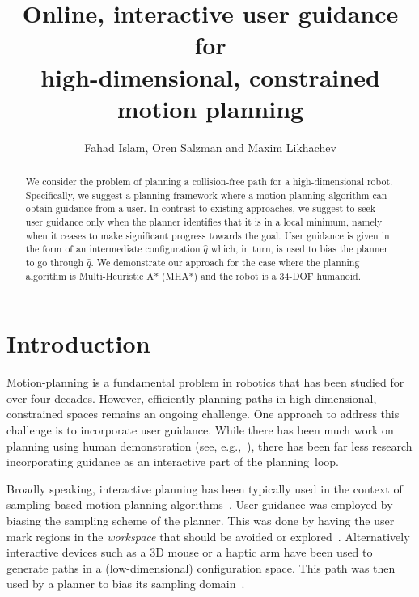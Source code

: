 \documentclass[conference]{IEEEtran}
\begin{document}
\title{	Online, interactive user guidance for \\
		high-dimensional, constrained motion planning }

\author{Fahad Islam, Oren Salzman and Maxim Likhachev}


\maketitle
\thispagestyle{empty}
\pagestyle{empty}



\begin{abstract}
We consider the problem of planning a collision-free path for a high-dimensional robot.
Specifically, we suggest a planning framework where a motion-planning algorithm can obtain guidance from a user.
In contrast to existing approaches, we suggest to seek user guidance only when the planner identifies that it is in a local minimum, namely when it ceases to make significant progress towards the goal.
User guidance is given in the form of an intermediate configuration $\hat{q}$ which, in turn, is used to bias the planner to go through $\hat{q}$.
We demonstrate our approach for the case where the planning algorithm is Multi-Heuristic A* (MHA*) and the robot is a 34-DOF humanoid.
\end{abstract}

\IEEEpeerreviewmaketitle

\section{Introduction}
\label{sec:intro}

Motion-planning is a fundamental problem in robotics that has been studied for over four decades. 
However, efficiently planning paths in high-dimensional, constrained spaces remains an ongoing challenge.
One approach to address this challenge is to incorporate user guidance.
While there has been much work on planning using human demonstration 
(see, e.g.,~\cite{HS16, PHCL16, SHLA16, YA17}), 
there has been far less research incorporating guidance as an interactive part of the planning~loop.

Broadly speaking, interactive planning has been typically used in the context of sampling-based motion-planning algorithms~\cite{L06}.
User guidance was employed by biasing the sampling scheme of the planner.
This was done by having the user mark regions in the \emph{workspace} that should be avoided or 
explored~\cite{DSJA14}.
Alternatively interactive devices such as a 3D mouse or a haptic arm have been used to generate paths in a (low-dimensional) configuration space. This path was then used by a planner to bias its 
sampling domain~\cite{BTFF16, FTF09, TFF12}.
\end{document}
